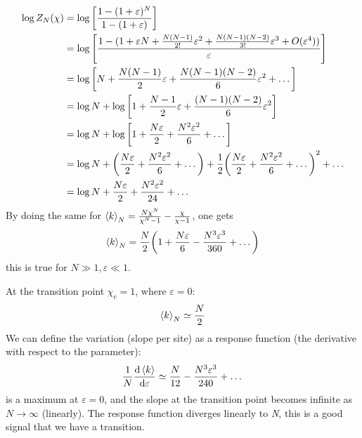 \documentclass[../main/main.tex]{subfiles}
\begin{document}
\begin{equation}
\begin{split}
  \log{Z_N} (\chi)  &=  \log{\qty[\frac{1-(1+\varepsilon )^N}{1-(1+\varepsilon )}] }  \\
  & =   \log{\qty[\frac{1-(1+\varepsilon N  + \frac{N(N-1)}{2!}\varepsilon ^2 + \frac{N(N-1)(N-2)}{3!}\varepsilon ^3 +O(\varepsilon ^4))}{\varepsilon }] } \\
  & = \log{\qty[N + \frac{N(N-1)}{2}\varepsilon + \frac{N(N-1)(N-2)}{6}\varepsilon^2 + \dots]  } \\
  & = \log{N} + \log{\qty[1+\frac{N-1}{2}\varepsilon +\frac{(N-1)(N-2)}{6}\varepsilon ^2] } \\
  & = \log{N} + \log{\qty[1+ \frac{N \varepsilon }{2}+ \frac{N^2 \varepsilon ^2}{6}+ \dots] }  \\
  & = \log{N} + \qty( \frac{N \varepsilon }{2} + \frac{N^2 \varepsilon ^2}{6} + \dots) + \frac{1}{2} \qty(\frac{N \varepsilon }{2} + \frac{N^2 \varepsilon ^2}{6} + \dots)^2  + \dots  \\
  & = \log{N}+ \frac{N \varepsilon }{2} + \frac{N^2 \varepsilon ^2}{24} + \dots
\end{split}
\end{equation}
By doing the same for \(   \expval{k}_N = \frac{N \chi^N}{\chi^N-1} - \frac{\chi}{\chi-1} \), one gets
\begin{equation}
  \expval{k}_N = \frac{N}{2} \qty( 1 + \frac{N \varepsilon }{6} - \frac{N^3 \varepsilon ^3}{360} + \dots)
\end{equation}
this is true for \( N \gg 1, \varepsilon \ll 1 \).

At the transition point \( \chi _c =1 \), where \( \varepsilon =0 \):
\begin{equation*}
  \expval{k}_N \simeq \frac{N}{2}
\end{equation*}
We can define the variation (slope per site) as a response function (the derivative with respect to the parameter):
\begin{equation}
  \frac{1}{N}\dv{\expval{k} }{\varepsilon } \simeq \frac{N}{12} - \frac{N^3 \varepsilon ^3}{240} + \dots
\end{equation}
is a maximum at \( \varepsilon =0 \), and the slope at the transition point becomes infinite as \( N \rightarrow \infty  \) (linearly). The response function diverges linearly to \emph{N}, this is a good signal that we have a transition.
\end{document}
